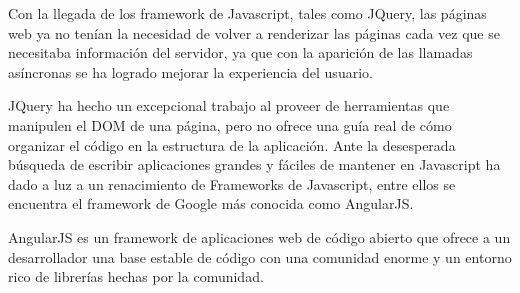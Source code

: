 Con la llegada de los framework de Javascript, tales como JQuery, las páginas web ya no tenían la necesidad de volver a renderizar las páginas cada vez que se necesitaba información del servidor, ya que con la aparición de las llamadas asíncronas se ha logrado mejorar la experiencia del usuario.

JQuery ha hecho un excepcional trabajo al proveer de herramientas que manipulen el DOM de una página, pero no ofrece una guía real de cómo organizar el código en la estructura de la aplicación. Ante la desesperada búsqueda de escribir aplicaciones grandes y fáciles de mantener en Javascript ha dado a luz a un renacimiento de Frameworks de Javascript, entre ellos se encuentra el framework de Google más conocida como AngularJS.

AngularJS es un framework de aplicaciones web de código abierto que ofrece a un desarrollador una base estable de código con una comunidad enorme y un entorno rico de librerías hechas por la comunidad.